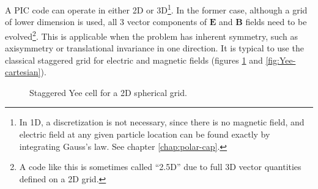 A PIC code can operate in either 2D or 3D\footnote{In 1D, a discretization is
  not necessary, since there is no magnetic field, and electric field at any
  given particle location can be found exactly by integrating Gauss's law. See
  chapter \ref{chap:polar-cap}.}.
In the former case, although a grid of lower dimension is used, all 3 vector
components of $\mathbf{E}$ and $\mathbf{B}$ fields need to be
evolved\footnote{A code like this is sometimes called ``2.5D'' due to full 3D vector quantities
  defined on a 2D grid.}. This is applicable when the problem has inherent
symmetry, such as axisymmetry or translational invariance in one direction. It
is typical to use the classical staggered \citet{yee_numerical_1966} grid for
electric and magnetic fields (figures \ref{fig:Yee} and
\ref{fig:Yee-cartesian}).

\begin{figure}[h]
  \centering
  \caption{Staggered Yee cell for a 2D spherical grid.}
  \label{fig:Yee}
\end{figure}


